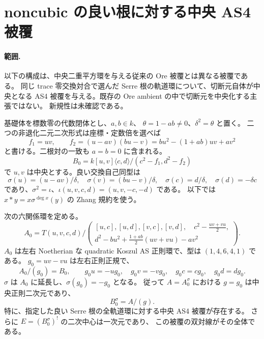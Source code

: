 \section{noncubic の良い根に対する中央 AS4 被覆}
\label{sec:noncubic-central-hull}

\paragraph{範囲.}
以下の構成は、中央二重平方環を与える従来の Ore 被覆とは異なる被覆である。
同じ trace 零交換対合で選んだ Serre 根の軌道環について、切断元自体が中央となる
AS4 被覆を与える。既存の Ore ambient の中で切断元を中央化する主張ではない。
新規性は未確認である。

基礎体を標数零の代数閉体とし、\(a,b\in k\)、
\(\theta=1-ab\ne0\)、\(\delta^2=\theta\) と置く。
二つの非退化二元二次形式は座標・定数倍を選べば
\[
 f_1=uv,\qquad f_2=(u-av)(bu-v)
       =bu^2-(1+ab)uv+av^2
\]
と書ける。二根対の一致も \(a=b=0\) に含まれる。
\[
 B_0=k[u,v]\langle c,d\rangle/(c^2-f_1,d^2-f_2)
\]
で \(u,v\) は中央とする。良い交換自己同型は
\[
 \sigma(u)=(u-av)/\delta,\quad
 \sigma(v)=(bu-v)/\delta,\quad
 \sigma(c)=d/\delta,\quad \sigma(d)=-\delta c
\]
であり、\(\sigma^2=\iota\)、\(\iota(u,v,c,d)=(u,v,-c,-d)\) である。
以下では \(x*y=x\sigma^{\deg x}(y)\) の Zhang 規約を使う。

\begin{theorem}\label{thm:noncubic-central-hull}
次の六関係環を定める。
\[
 A_0=T(u,v,c,d)\Big/
 \left(
 \begin{gathered}
 [u,c],[u,d],[v,c],[v,d],\quad c^2-\frac{uv+vu}{2},\\
 d^2-bu^2+\frac{1+ab}{2}(uv+vu)-av^2
 \end{gathered}
 \right).
\]
\(A_0\) は左右 Noetherian な quadratic Koszul AS 正則環で、型は
\((1,4,6,4,1)\) である。
\(g_0=uv-vu\) は左右正則正規で、
\[
 A_0/(g_0)=B_0,\qquad
 g_0u=-ug_0,\quad g_0v=-vg_0,\quad
 g_0c=cg_0,\quad g_0d=dg_0.
\]
\(\sigma\) は \(A_0\) に延長し、\(\sigma(g_0)=-g_0\) となる。
従って \(A=A_0^\sigma\) における \(g=g_0\) は中央正則二次元であり、
\[
 B_0^\sigma=A/(g).
\]
特に、指定した良い Serre 根の全軌道環に対する中央 AS4 被覆が存在する。
さらに \(E=(B_0^\sigma)^!\) の二次中心は一次元であり、
この被覆の双対線がその全体である。
\end{theorem}

